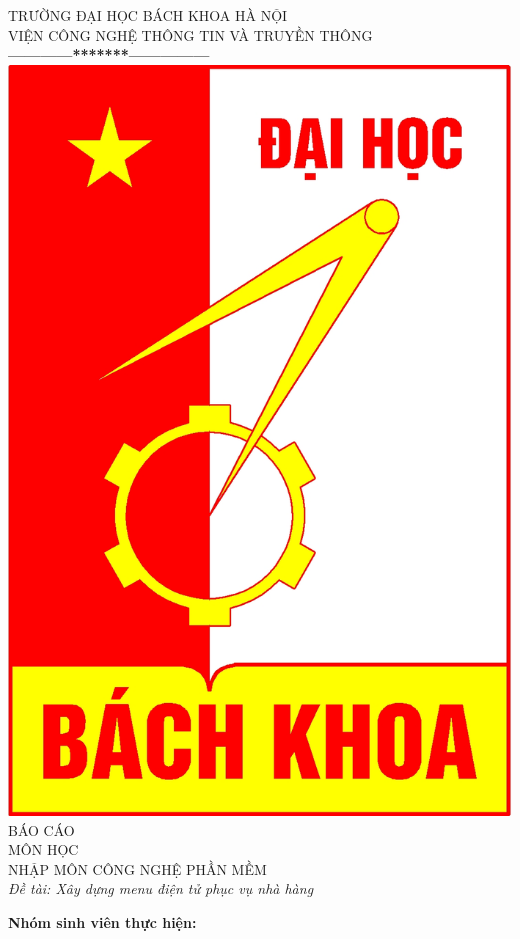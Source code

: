 \documentclass[a4paper,12pt]{report}
\begin{document}
\thispagestyle{empty}
\thisfancypage{
\setlength{\fboxrule}{1pt}
\doublebox}{}
\begin{center}
{\fontsize{16}{19}\selectfont TRƯỜNG ĐẠI HỌC BÁCH KHOA HÀ NỘI\\
VIỆN CÔNG NGHỆ THÔNG TIN VÀ TRUYỀN THÔNG}\\
\textbf{------------*******---------------}\\[1cm]
\includegraphics[scale=0.13]{hust.jpg}\\[1.3cm]

{\fontsize{32}{43}\selectfont BÁO CÁO}\\[0.1cm]
{\fontsize{38}{45}\selectfont MÔN HỌC}\\[0.2cm]
{\fontsize{19}{20}\selectfont NHẬP MÔN CÔNG NGHỆ PHẦN MỀM}\\[0.2cm]
{\fontsize{19}{20}\selectfont \emph{Đề tài: Xây dựng menu điện tử phục vụ nhà hàng}}\\[2.0cm]
\end{center}
\hspace{1cm}\fontsize{14}{16}\selectfont \textbf{Nhóm sinh viên thực hiện:}
\end{document}
